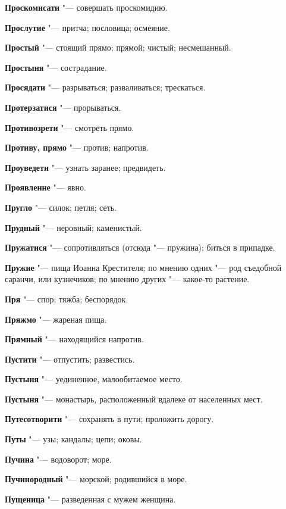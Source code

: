 \begin{mymulticols}
\noindent\textbf{Проскомисати} "--- совершать проскомидию. 

\noindent\textbf{Прослутие} "--- притча; пословица; осмеяние. 

\noindent\textbf{Простый} "--- стоящий прямо; прямой; чистый; несмешанный. 

\noindent\textbf{Простыня} "--- сострадание. 

\noindent\textbf{Просядати} "--- разрываться; разваливаться; трескаться. 

\noindent\textbf{Протерзатися} "--- прорываться. 

\noindent\textbf{Противозрети} "--- смотреть прямо. 

\noindent\textbf{Противу, прямо} "--- против; напротив. 

\noindent\textbf{Проуведети} "--- узнать заранее; предвидеть. 

\noindent\textbf{Проявленне} "--- явно. 

\noindent\textbf{Пругло} "--- силок; петля; сеть. 

\noindent\textbf{Прудный} "--- неровный; каменистый. 

\noindent\textbf{Пружатися} "--- сопротивляться (отсюда "--- пружина); биться в припадке. 

\noindent\textbf{Пружие} "--- пища Иоанна Крестителя; по мнению одних "--- род съедобной саранчи, или кузнечиков; по мнению других "--- какое-то растение. 

\noindent\textbf{Пря} "--- спор; тяжба; беспорядок. 

\noindent\textbf{Пряжмо} "--- жареная пища. 

\noindent\textbf{Прямный} "--- находящийся напротив. 

\noindent\textbf{Пустити} "--- отпустить; развестись. 

\noindent\textbf{Пустыня} "--- уединенное, малообитаемое место. 

\noindent\textbf{Пустыня} "--- монастырь, расположенный вдалеке от населенных мест. 

\noindent\textbf{Путесотворити} "--- сохранять в пути; проложить дорогу. 

\noindent\textbf{Путы} "--- узы; кандалы; цепи; оковы. 

\noindent\textbf{Пучина} "--- водоворот; море. 

\noindent\textbf{Пучинородный} "--- морской; родившийся в море. 

\noindent\textbf{Пущеница} "--- разведенная с мужем женщина. 


\end{mymulticols}
